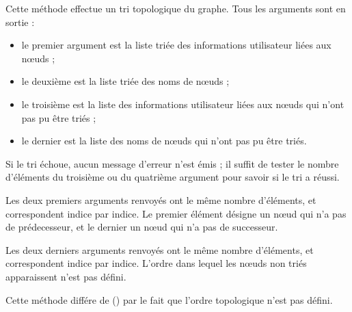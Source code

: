 Cette méthode effectue un tri topologique du graphe. Tous les arguments sont en sortie :
\begin{itemize}
  \item le premier argument  est la liste triée des informations utilisateur liées aux nœuds ;
  \item le deuxième  est la liste triée des noms de nœuds ;
  \item le troisième  est la liste des informations utilisateur liées aux nœuds qui n'ont pas pu être triés ;
  \item le dernier  est la liste des noms de nœuds qui n'ont pas pu être triés.
\end{itemize}

Si le tri échoue, aucun message d'erreur n'est émis ; il suffit de tester le nombre d'éléments du troisième ou du quatrième argument pour savoir si le tri a réussi.

Les deux premiers arguments renvoyés ont le même nombre d'éléments, et correspondent indice par indice. Le premier élément désigne un nœud qui n'a pas de prédecesseur, et le dernier un nœud qui n'a pas de successeur.


Les deux derniers arguments renvoyés ont le même nombre d'éléments, et correspondent indice par indice. L'ordre dans lequel les nœuds non triés apparaissent n'est pas défini.

Cette méthode différe de  () par le fait que  l'ordre topologique n'est pas défini.
